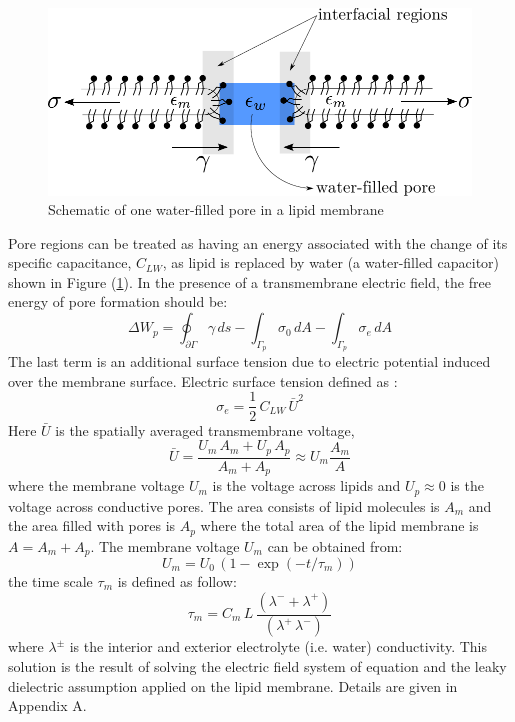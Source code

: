\documentclass[english,12pt]{article}
\begin{document}
\begin{figure}[H]
	\centering
	\includegraphics[scale=0.8]{pics/pore1_1.pdf}
	\caption{\footnotesize{Schematic of one water-filled pore in a lipid membrane}}
	\label{fig:pore1}
\end{figure}
Pore regions can be treated as having an energy associated with the change of its specific capacitance, $C_{LW}$, as lipid is replaced by water (a water-filled capacitor) shown in Figure (\ref{fig:pore1}). 
In the presence of a transmembrane electric field, the free energy of pore formation should be:
\begin{equation}
\Delta W_{p} = \oint_{\partial\Gamma}\gamma\,ds - \int_{\Gamma_p}\sigma_0\,dA-\int_{\Gamma_p}\sigma_e\,dA 
\label{eqn:poreenergy}
\end{equation}
The last term is an additional surface tension due to electric potential induced over the membrane surface. Electric surface tension defined as \cite{Weaver1996135}:
\begin{equation}
	\sigma_e=\frac{1}{2}\,C_{LW}\,\bar{U}^{2}
	\label{eqn:elecsurface}
\end{equation}
 Here $\bar{U}$ is the spatially averaged transmembrane voltage, 
\begin{equation}
\bar{U}=\frac{U_m\,A_m+U_p\,A_p}{A_m+A_p}\approx U_m\frac{A_m}{A}
\end{equation}
where the membrane voltage $U_m$ is the voltage across lipids and $U_p\approx0$ is the voltage across conductive pores. The area consists of lipid molecules is $A_m$ and the area filled with pores is $A_p$ where the total area of the lipid membrane is $A=A_m+A_p$. The membrane voltage $U_m$ can be obtained from:
\begin{equation}
	U_m = U_0\,\left(1-\exp({-t/\tau_m}) \right)
\end{equation}
the time scale $\tau_m$ is defined as follow:
\begin{equation}
	\tau_m=C_m\,L\,\frac{(\lambda^{-} + \lambda^{+})}{(\lambda^{+}\,\lambda^{-})}
\end{equation}
where $\lambda^{\pm}$ is the interior and exterior electrolyte (i.e. water) conductivity. This solution is the result of solving the electric field system of equation and the leaky dielectric assumption applied on the lipid membrane. Details are given in Appendix A.
\end{document}

